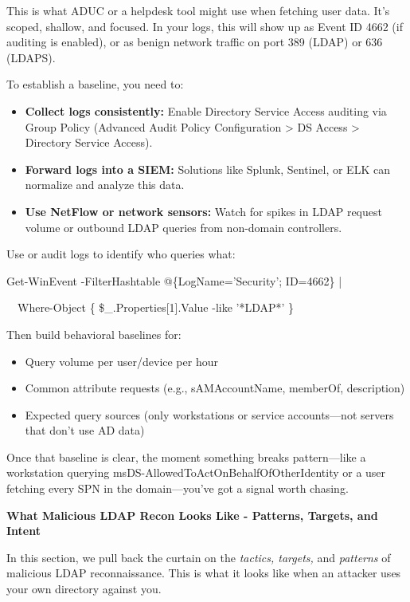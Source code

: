 {{This is what ADUC or a helpdesk tool might use when fetching user data. It’s scoped, shallow, and focused. In your logs, this will show up as Event ID 4662 (if auditing is enabled), or as benign network traffic on port 389 (LDAP) or 636 (LDAPS).

To establish a baseline, you need to:

\begin{itemize}
    \item \textbf{Collect logs consistently:} Enable Directory Service Access auditing via Group Policy (Advanced Audit Policy Configuration > DS Access > Directory Service Access).

    \item \textbf{Forward logs into a SIEM:} Solutions like Splunk, Sentinel, or ELK can normalize and analyze this data.

    \item \textbf{Use NetFlow or network sensors:} Watch for spikes in LDAP request volume or outbound LDAP queries from non-domain controllers.

\end{itemize}
Use   or audit logs to identify who queries what:

 

 

Get-WinEvent -FilterHashtable @\{LogName='Security'; ID=4662\} |

  Where-Object \{ \$_.Properties[1].Value -like '*LDAP*' \}

Then build behavioral baselines for:

\begin{itemize}
    \item Query volume per user/device per hour

    \item Common attribute requests (e.g., sAMAccountName, memberOf, description)

    \item Expected query sources (only workstations or service accounts—not servers that don’t use AD data)

\end{itemize}
Once that baseline is clear, the moment something breaks pattern—like a workstation querying msDS-AllowedToActOnBehalfOfOtherIdentity or a user fetching every SPN in the domain—you’ve got a signal worth chasing.

\textbf{What Malicious LDAP Recon Looks Like - Patterns, Targets, and Intent}

In this section, we pull back the curtain on the \textit{tactics, targets, }and \textit{patterns }of malicious LDAP reconnaissance. This is what it looks like when an attacker uses your own directory against you.

}}
